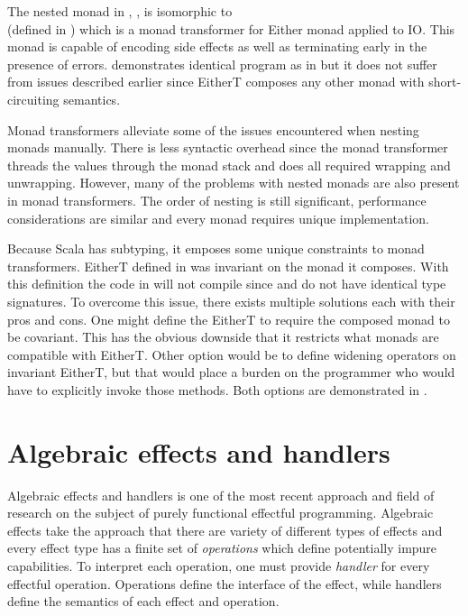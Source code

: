 The nested monad in , , is isomorphic to \\ (defined in ) which is a monad transformer for Either monad applied to IO. This monad is capable of encoding side effects as well as terminating early in the presence of errors.  demonstrates identical program as in  but it does not suffer from issues described earlier since EitherT composes any other monad with short-circuiting semantics.



Monad transformers alleviate some of the issues encountered when nesting monads manually. There is less syntactic overhead since the monad transformer threads the values through the monad stack and does all required wrapping and unwrapping. However, many of the problems with nested monads are also present in monad transformers. The order of nesting is still significant, performance considerations are similar and every monad requires unique implementation. 

Because Scala has subtyping, it emposes some unique constraints to monad transformers. EitherT defined in  was invariant on the monad it composes. With this definition the code in  will not compile since  and  do not have identical type signatures. To overcome this issue, there exists multiple solutions each with their pros and cons. One might define the EitherT to require the composed monad to be covariant. This has the obvious downside that it restricts what monads are compatible with EitherT. Other option would be to define widening operators on invariant EitherT, but that would place a burden on the programmer who would have to explicitly invoke those methods. Both options are demonstrated in .





\section{Algebraic effects and handlers} \label{background:alg-eff}
Algebraic effects and handlers is one of the most recent approach and field of research on the subject of purely functional effectful programming. Algebraic effects take the approach that there are variety of different types of effects and every effect type has a finite set of \textit{operations} which define potentially impure capabilities. To interpret each operation, one must provide \textit{handler} for every effectful operation. Operations define the interface of the effect, while handlers define the semantics of each effect and operation.

